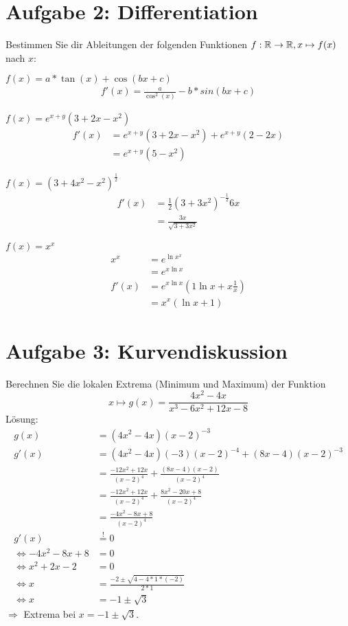 \section*{Aufgabe 2: Differentiation}
Bestimmen Sie dir Ableitungen der folgenden Funktionen $f : \mathbb{R} \rightarrow \mathbb{R}, x \mapsto f(x)$ nach $x$:
\begin{enumeralph}
	\item $f(x) = a * \tan(x) + \cos(bx + c)$\\
	\begin{align*}
	f'(x) = \frac{a}{\cos^2(x)} - b * sin(bx+c)
	\end{align*}
	\item $f(x) = e^{x+y} (3 + 2x - x^2)$
	\begin{align*}
	f'(x) &= e^{x+y} (3+2x-x^2) + e^{x+y} (2-2x)\\
	&=e^{x+y}(5-x^2)
	\end{align*}
	\item $f(x) = (3+4x^2-x^2)^{\frac{1}{2}}$
	\begin{align*}
	f'(x)&=\frac{1}{2}(3+3x^2)^{-\frac{1}{2}} 6x\\
	&=\frac{3x}{\sqrt{3+3x^2}}
	\end{align*}
	\item $f(x)=x^x$
	\begin{align*}
	x^x &= e^{\ln{x^x}}\\
	&=e^{x\ln x}\\
	f'(x)&=e^{x \ln x}(1 \ln x  + x\frac{1}{x})\\
	&=x^x(\ln x + 1)
	\end{align*}
\end{enumeralph}
\section*{Aufgabe 3: Kurvendiskussion}
Berechnen Sie die lokalen Extrema (Minimum und Maximum) der Funktion
\[x \mapsto g(x) = \frac{4x^2-4x}{x^3-6x^2+12x-8}\]
Lösung:
\begin{align*}
g(x)&=(4x^2-4x)(x-2)^{-3}\\
g'(x)&=(4x^2-4x)(-3)(x-2)^{-4} + (8x-4)(x-2)^{-3}\\
&=\frac{-12x^2+12x}{(x-2)^4} + \frac{(8x-4)(x-2)}{(x-2)^4}\\
&=\frac{-12x^2+12x}{(x-2)^4} + \frac{8x^2-20x+8}{(x-2)^4}\\
&=\frac{-4x^2-8x+8}{(x-2)^4}\\
g'(x)&\overset{!}{=}0\\
\Leftrightarrow-4x^2-8x+8&=0\\
\Leftrightarrow x^2+2x-2&=0\\
\Leftrightarrow x&=\frac{-2\pm\sqrt{4-4*1*(-2)}}{2*1}\\
\Leftrightarrow x&=-1\pm\sqrt{3}
\end{align*}
$\Rightarrow$ Extrema bei $x = -1\pm\sqrt{3}$.

